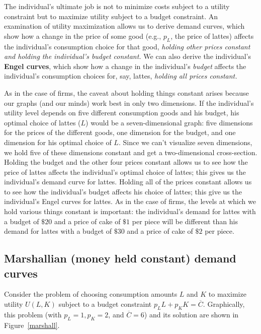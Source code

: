 The individual's ultimate job is not to minimize costs subject to a utility constraint but to maximize utility subject to a budget constraint. An examination of utility maximization allows us to derive demand curves, which show how a change in the price of some good (e.g., $p_L$, the price of lattes) affects the individual's consumption choice for that good, \emph{holding other prices constant and holding the individual's budget constant.} We can also derive the individual's \textbf{Engel curves}, which show how a change in the individual's \emph{budget} affects the individual's consumption choices for, say, lattes, \emph{holding all prices constant.}

As in the case of firms, the caveat about holding things constant arises because our graphs (and our minds) work best in only two dimensions. If the individual's utility level depends on five different consumption goods and his budget, his optimal choice of lattes ($L$) would be a seven-dimensional graph: five dimensions for the prices of the different goods, one dimension for the budget, and one dimension for his optimal choice of $L$. Since we can't visualize seven dimensions, we hold five of these dimensions constant and get a two-dimensional cross-section. Holding the budget and the other four prices constant allows us to see how the price of lattes affects the individual's optimal choice of lattes; this gives us the individual's demand curve for lattes. Holding all of the prices constant allows us to see how the individual's budget affects his choice of lattes; this give us the  individual's Engel curves for lattes. As in the case of firms, the levels at which we hold various things constant is important: the individual's demand for lattes with a budget of $\$20$ and a price of cake of $\$1$ per piece will be different than his demand for lattes with a budget of $\$30$ and a price of cake of $\$2$ per piece.


\subsection*{Marshallian (money held constant) demand curves}

Consider the problem of choosing consumption amounts $L$ and $K$ to maximize utility $U(L, K)$ subject to a budget constraint $p_L L + p_K K=\overline{C}$. Graphically, this problem (with $p_L=1, p_K=2$, and $\overline{C}=6$) and its solution are shown in Figure~\ref{marshall}.

